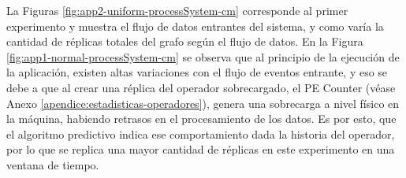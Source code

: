 %
%
%
%
%


La Figuras \ref{fig:app2-uniform-processSystem-cm} \normalsize{corresponde al primer experimento y muestra el flujo de datos entrantes del sistema, y como varía la cantidad de réplicas totales del grafo según el flujo de datos.} En la Figura \ref{fig:app1-normal-processSystem-cm} \normalsize{se observa que al principio de la ejecución de la aplicación, existen altas variaciones con el flujo de eventos entrante, y eso se debe a que al crear una réplica del operador sobrecargado, el PE Counter} (véase Anexo \ref{apendice:estadisticas-operadores}), \normalsize{genera una sobrecarga a nivel físico en la máquina, habiendo retrasos en el procesamiento de los datos. Es por esto, que el algoritmo predictivo indica ese comportamiento dada la historia del operador, por lo que se replica una mayor cantidad de réplicas en este experimento en una ventana de tiempo.}

